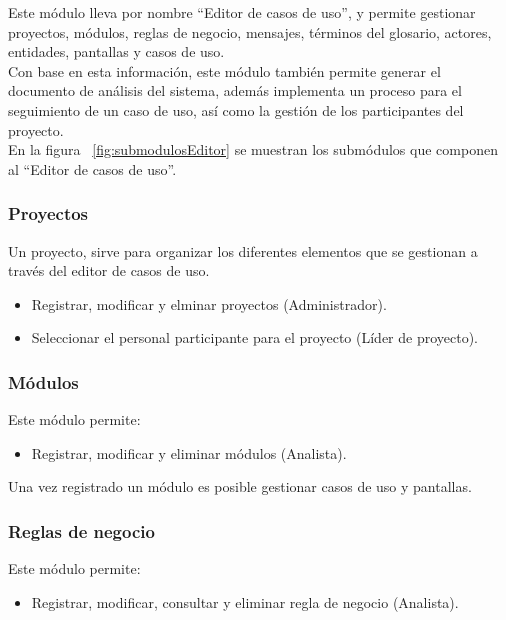 Este módulo lleva por nombre ``Editor de casos de uso'', y permite gestionar proyectos, módulos, reglas de negocio, mensajes, términos del glosario, actores, entidades, pantallas y casos de uso.\\

Con base en esta información, este módulo también permite generar el documento de análisis del sistema, además implementa un proceso para el seguimiento de un caso de uso, así como la gestión de los participantes del proyecto.\\

En la figura ~\ref{fig:submodulosEditor} se muestran los submódulos que componen al ``Editor de casos de uso''.


\subsubsection{Proyectos}
	Un proyecto, sirve para organizar los diferentes elementos que se gestionan a través del editor de casos de uso. 
	
	\begin{itemize}
		\item Registrar, modificar y elminar proyectos (Administrador).
		\item Seleccionar el personal participante para el proyecto (Líder de proyecto). 
	\end{itemize}
			
\subsubsection{Módulos}
	Este módulo permite:
	\begin{itemize}
		\item Registrar, modificar y eliminar módulos (Analista). 
	\end{itemize}

	Una vez registrado un módulo es posible gestionar casos de uso y pantallas.


\subsubsection{Reglas de negocio}
	Este módulo permite:
	\begin{itemize}
		\item Registrar, modificar, consultar y eliminar regla de negocio (Analista). 
	\end{itemize}

